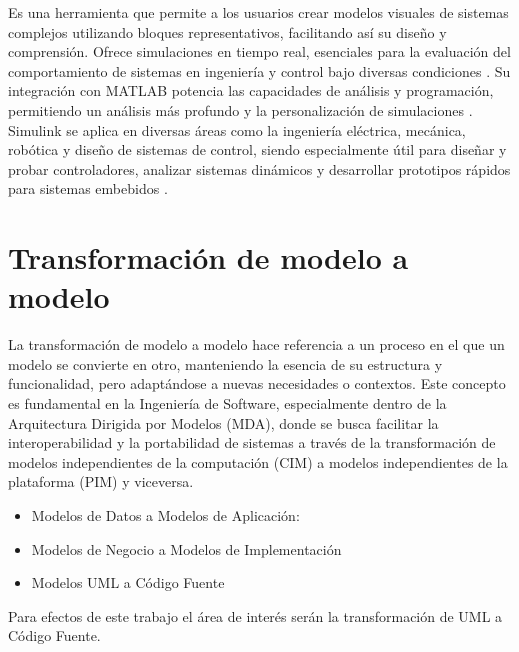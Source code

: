 Es una herramienta que permite a los usuarios crear modelos visuales de sistemas complejos utilizando bloques representativos, facilitando así su diseño y comprensión. Ofrece simulaciones en tiempo real, esenciales para la evaluación del comportamiento de sistemas en ingeniería y control bajo diversas condiciones \cite{PealozaLuna2022SimulacinDU}. Su integración con MATLAB potencia las capacidades de análisis y programación, permitiendo un análisis más profundo y la personalización de simulaciones \cite{Daza2021PlataformaDP}. Simulink se aplica en diversas áreas como la ingeniería eléctrica, mecánica, robótica y diseño de sistemas de control, siendo especialmente útil para diseñar y probar controladores, analizar sistemas dinámicos y desarrollar prototipos rápidos para sistemas embebidos \cite*{CardozoSarmiento2019SimulationOI}.

\section{Transformación de modelo a modelo}\label{sec:modelo2model}

La transformación de modelo a modelo hace referencia a un proceso en el que un modelo se convierte en otro, manteniendo la esencia de su estructura y funcionalidad, pero adaptándose a nuevas necesidades o contextos. Este concepto es fundamental en la Ingeniería de Software, especialmente dentro de la Arquitectura Dirigida por Modelos (MDA), donde se busca facilitar la interoperabilidad y la portabilidad de sistemas a través de la transformación de modelos independientes de la computación 
(CIM) a modelos independientes de la plataforma (PIM) y viceversa.

\begin{itemize}
    \item Modelos de Datos a Modelos de Aplicación:
    \item Modelos de Negocio a Modelos de Implementación
    \item Modelos UML a Código Fuente
\end{itemize}

Para efectos de este trabajo el área de interés serán la transformación de UML a Código Fuente.

%

